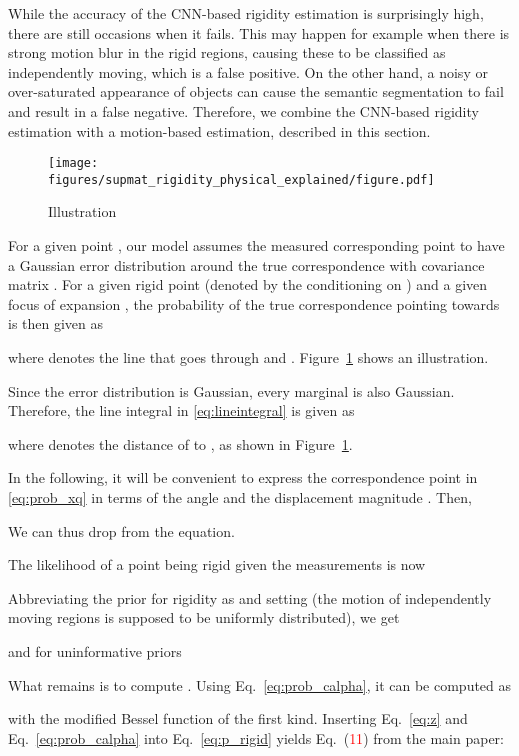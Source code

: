 \documentclass[10pt,twocolumn,letterpaper]{article}
\begin{document}
While the accuracy of the CNN-based rigidity estimation is surprisingly high, there are still occasions when it fails.
This may happen for example when there is strong motion blur in the rigid regions, causing these to be classified as independently moving, which is a false positive. 
On the other hand, a noisy or over-saturated appearance of objects can cause the semantic segmentation to fail and result in a false negative.
Therefore, we combine the CNN-based rigidity estimation with a motion-based estimation, described in this section.

\begin{figure}
	\centering
	\texttt{[image: figures/supmat\_rigidity\_physical\_explained/figure.pdf]}
	\caption{Illustration}
	\label{fig:illustration}
\end{figure}

For a given point , our model assumes the measured corresponding point  to have a Gaussian error distribution around the true correspondence with covariance matrix .
For a given rigid point (denoted by the conditioning on ) and a given focus of expansion , the probability of the true correspondence pointing towards  is then given as

where  denotes the line that goes through  and .
Figure~\ref{fig:illustration} shows an illustration.

Since the error distribution is Gaussian, every marginal is also Gaussian.
Therefore, the line integral in \eqref{eq:lineintegral} is given as

where  denotes the distance of  to , as shown in Figure~\ref{fig:illustration}.

In the following, it will be convenient to express the correspondence point  in \eqref{eq:prob_xq} in terms of the angle  and the displacement magnitude .
Then,

We can thus drop  from the equation.

The likelihood of a point being rigid given the measurements  is now

Abbreviating the prior for rigidity  as  and setting  (the motion of independently moving regions is supposed to be uniformly distributed), we get

and for uninformative priors 


What remains is to compute .
Using Eq.~\eqref{eq:prob_calpha}, it can be computed as

with  the modified Bessel function of the first kind.
Inserting Eq.~\eqref{eq:z} and Eq.~\eqref{eq:prob_calpha} into Eq.~\ref{eq:p_rigid} yields Eq.~(\textcolor{red}{11}) from the main paper:
\end{document}
